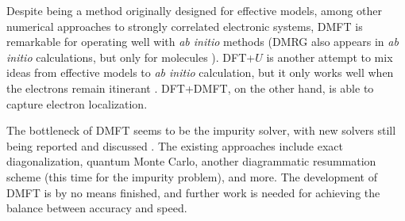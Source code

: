 \documentclass[hyperref, a4paper]{article}
\begin{document}
Despite being a method originally designed for effective models,
among other numerical approaches to strongly correlated electronic systems,
DMFT is remarkable for operating well with \textit{ab initio} methods
(DMRG also appears in \textit{ab initio} calculations, 
but only for molecules \cite{baiardi2020density}).
DFT+$U$ is another attempt to mix ideas from effective models to \textit{ab initio} calculation,
but it only works well when the electrons remain itinerant \cite{pavarini2021solving}.
DFT+DMFT, on the other hand, is able to capture electron localization.

The bottleneck of DMFT seems to be the impurity solver,
with new solvers still being reported and discussed
\cite{weber2012augmented,ganahl2015efficient,PhysRevB.104.035160,de2019quantitative}.
The existing approaches include 
exact diagonalization, 
quantum Monte Carlo, 
another diagrammatic resummation scheme (this time for the impurity problem),
and more.
The development of DMFT is by no means finished,
and further work is needed for achieving the balance between accuracy and speed.

\printbibliography
\end{document}
